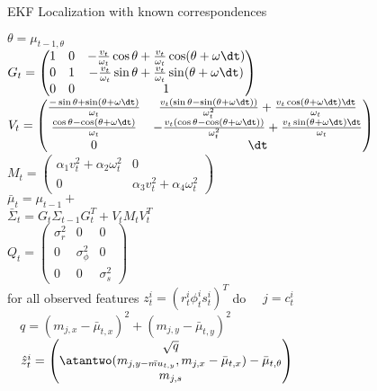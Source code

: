 \begin{algorithm}[H]
\caption{EKF Localization with known correspondences}
\BlankLine
$\theta = \mu_{t-1, \theta}$\\
$G_t = \begin{pmatrix} 1 & 0 & -\frac{v_t}{\omega_t}\cos \theta + \frac{v_t}{\omega_t}\cos (\theta + \omega \dt) \\ 0 & 1 & -\frac{v_t}{\omega_t}\sin \theta + \frac{v_t}{\omega_t}\sin (\theta + \omega \dt) \\ 0 & 0 & 1 \end{pmatrix} $\\
\BlankLine
$V_t = \begin{pmatrix}\frac{-\sin\theta + \sin(\theta+\omega\dt)}{\omega_t} &  \frac{v_t(\sin\theta - \sin(\theta+\omega\dt))}{\omega_t^2} + \frac{v_t\cos(\theta+\omega\dt) \dt}{\omega_t} \\
\frac{\cos\theta - \cos(\theta+\omega\dt)}{\omega_t} & -\frac{v_t(\cos\theta - \cos(\theta+\omega\dt))}{\omega_t^2} + \frac{v_t\sin(\theta+\omega\dt) \dt}{\omega_t} \\
0 & \dt \end{pmatrix}$\\
\BlankLine
$M_t = \begin{pmatrix} \alpha_1 v_t^2 + \alpha_2 \omega_t^2 & 0 \\ 0 & \alpha_3 v_t^2 + \alpha_4\omega_t^2 \end{pmatrix}$\\
\BlankLine
$\bar{\mu}_t = \mu_{t-1} + $\\
\BlankLine
$\bar{\Sigma}_t = G_t \Sigma_{t-1} G_t^T + V_t M_t V_t^T$\\
\BlankLine
$Q_t = \begin{pmatrix} \sigma_r^2 & 0 & 0 \\ 0 & \sigma_{\phi}^2 & 0 \\ 0 & 0 & \sigma_s^2 \end{pmatrix}$\\
\BlankLine
for all observed features $z_t^i = (r_t^i \phi_t^i s_t^i)^T$ do
$\quad j = c_t^i $\\
$\quad q = (m_{j,x} - \bar{\mu}_{t,x})^2 + (m_{j,y} - \bar{\mu}_{t,y})^2$\\
\BlankLine
$\quad \hat{z}_t^i = \begin{pmatrix} \sqrt{q} \\ \atantwo (m_{j,y - \bar{mu}_{t,y}}, m_{j,x} - \bar{\mu}_{t,x}) - \bar{\mu}_{t, \theta} \\ m_{j,s} \end{pmatrix}$ \\

\end{algorithm}
